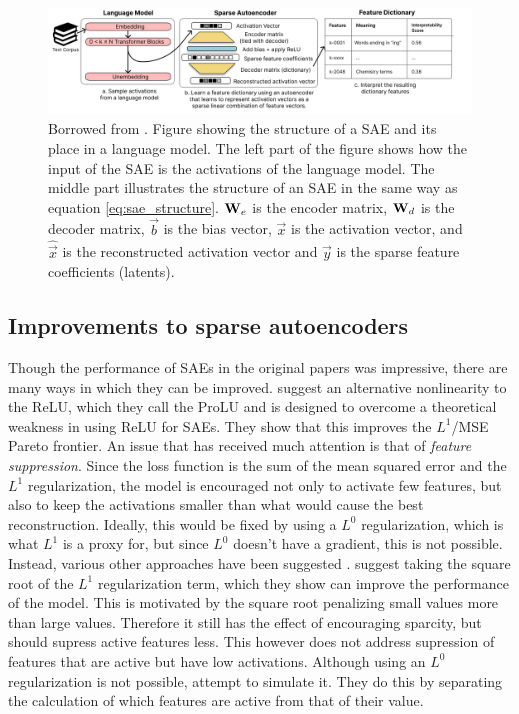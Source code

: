 \begin{figure}[h]
    \centering
    \includegraphics[width=\textwidth]{images/cunningham_sae_illustration.png}
    \caption{Borrowed from \textcite{cunningham_sparse_2023}. 
    Figure showing the structure of a SAE and its place in a language model.
    The left part of the figure shows how the input of the SAE is the activations of the language model.
    The middle part illustrates the structure of an SAE in the same way as equation \ref{eq:sae_structure}.
    $\mathbf{W}_e$ is the encoder matrix, $\mathbf{W}_d$ is the decoder matrix, $\vec b$ is the bias vector, $\vec x$ is the activation vector, and $\hat{\vec x}$ is the reconstructed activation vector and $\vec y$ is the sparse feature coefficients (latents).
    }
    \label{fig:cunningham_sae_illustration}
\end{figure}

\subsection{Improvements to sparse autoencoders}\label{sec:improvements_to_saes}
Though the performance of SAEs in the original papers \parencite{bricken_towards_2023}\parencite{cunningham_sparse_2023} was impressive, there are many ways in which they can be improved.
\textcite{taggart_prolu_2024} suggest an alternative nonlinearity to the ReLU, which they call the ProLU and is designed to overcome a theoretical weakness in using ReLU for SAEs.
They show that this improves the $L^1$/MSE Pareto frontier.
An issue that has received much attention is that of \emph{feature suppression}.
Since the loss function is the sum of the mean squared error and the $L^1$ regularization, the model is encouraged not only to activate few features, but also to keep the activations smaller than what would cause the best reconstruction.
Ideally, this would be fixed by using a $L^0$ regularization, which is what $L^1$ is a proxy for, but since $L^0$ doesn't have a gradient, this is not possible.
Instead, various other approaches have been suggested \parencite{wright_addressing_2024}.
\textcite{riggs_improving_2024} suggest taking the square root of the $L^1$ regularization term, which they show can improve the performance of the model.
This is motivated by the square root penalizing small values more than large values.
Therefore it still has the effect of encouraging sparcity, but should supress active features less.
This however does not address supression of features that are active but have low activations.
Although using an $L^0$ regularization is not possible, \textcite{rajamanoharan_improving_2024} attempt to simulate it.
They do this by separating the calculation of which features are active from that of their value.

